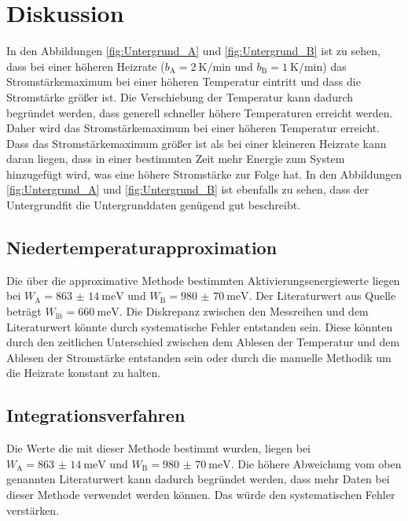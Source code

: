 \section{Diskussion}
\label{sec:Diskussion}
In den Abbildungen \ref{fig:Untergrund_A} und \ref{fig:Untergrund_B} ist zu sehen, dass bei einer höheren Heizrate ($b_{\text{A}}=
\SI{2}{\kelvin\per\minute}$ und $b_{\text{B}}=\SI{1}{\kelvin\per\minute}$) das Stromstärkemaximum bei einer höheren Temperatur 
eintritt und dass die Stromstärke größer ist. Die Verschiebung der Temperatur kann dadurch begründet werden, dass generell schneller höhere
Temperaturen erreicht werden. Daher wird das Stromstärkemaximum bei einer höheren Temperatur erreicht. Dass das Stromstärkemaximum
größer ist als bei einer kleineren Heizrate kann daran liegen, dass in einer bestimmten Zeit mehr Energie zum System hinzugefügt wird,
was eine höhere Stromstärke zur Folge hat. In den Abbildungen \ref{fig:Untergrund_A} und \ref{fig:Untergrund_B} ist ebenfalls zu sehen,
dass der Untergrundfit die Untergrunddaten genügend gut beschreibt.

\subsection{Niedertemperaturapproximation}
Die über die approximative Methode bestimmten Aktivierungsenergiewerte liegen bei $W_{\text{A}}=\SI{863(14)}{\milli\eV}$ und
$W_{\text{B}}=\SI{980(70)}{\milli\eV}$. Der Literaturwert aus Quelle \cite{Muccillo} beträgt $W_{\text{lit}}=\SI{660}{\milli\eV}$.
Die Diskrepanz zwischen den Messreihen und dem Literaturwert könnte durch systematische Fehler entstanden sein. Diese könnten 
durch den zeitlichen Unterschied zwischen dem Ablesen der Temperatur und dem Ablesen der Stromstärke entstanden sein oder 
durch die manuelle Methodik um die Heizrate konstant zu halten. 

\subsection{Integrationsverfahren}
Die Werte die mit dieser Methode bestimmt wurden, liegen bei $W_{\text{A}}=\SI{863(14)}{\milli\eV}$ und $W_{\text{B}}=\SI{980(70)}{\milli\eV}$.
Die höhere Abweichung vom oben genannten Literaturwert kann dadurch begründet werden, dass mehr Daten bei dieser Methode verwendet werden können.
Das würde den systematischen Fehler verstärken. 


